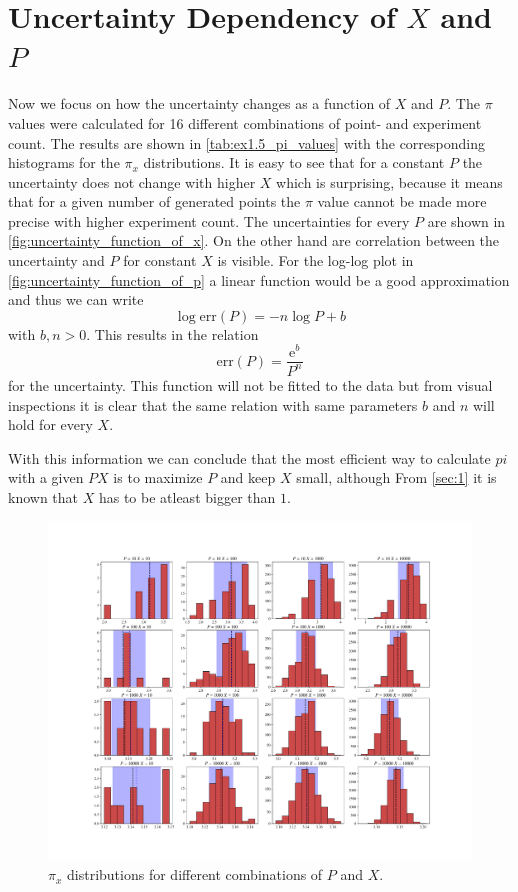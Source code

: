 \section{Uncertainty Dependency of $X$ and $P$}\label{sec:3}
Now we focus on how the uncertainty changes as a function of $X$ and $P$. 
The $\pi$ values were calculated for 16 different combinations of point- and 
experiment count. The results are shown in \cref{tab:ex1.5_pi_values} with 
the corresponding histograms for the $\pi_x$ distributions. 
It is easy to see that for a constant $P$ the uncertainty does not 
change with higher $X$ which is surprising, because it means that for a 
given number of generated points the $\pi$ value cannot be made 
more precise with higher experiment count. The uncertainties for every 
$P$ are shown in \cref{fig:uncertainty_function_of_x}. On the other hand 
are correlation between the uncertainty and $P$ for constant $X$ 
is visible. For the log-log plot in \cref{fig:uncertainty_function_of_p} a linear 
function would be a good approximation and thus we can write 
$$ \log \text{err}(P) = -n\log P + b$$
with $b, n > 0$. This results in the relation 
$$\text{err}(P) = \frac{\mathrm{e}^b}{P^n}$$
for the uncertainty. This function will not be fitted to the data but from visual
inspections it is clear that the same relation with same parameters $b$ and $n$ 
will hold for every $X$. \par 
With this information we can conclude that the most efficient way to calculate 
$pi$ with a given $PX$ is to maximize $P$ and keep $X$ small, although From 
\cref{sec:1} it is known that $X$ has to be atleast bigger than $1$.



\begin{figure}[htb]
    \centering
    \includegraphics[width=1\linewidth]{figs/ex1.5_px_combinations.pdf}
    \caption{$\pi_x$ distributions for different combinations of $P$ and $X$.}
    \label{fig:px_combinations}
\end{figure}

